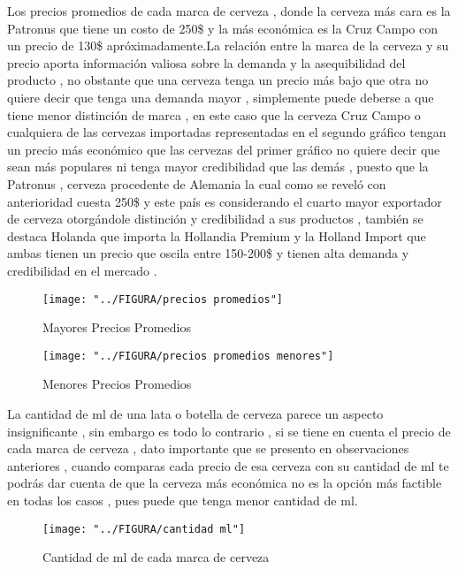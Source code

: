 \documentclass[10pt]{beamer}
\begin{document}
   	
   	\begin{frame}
   		
   	    Los precios promedios de cada marca de cerveza , donde la cerveza más cara es la Patronus que tiene un costo de 250\$ y la más económica es la Cruz Campo con un precio de 130\$ apróximadamente.La relación entre la marca de la cerveza y su precio aporta información valiosa sobre la demanda y la asequibilidad del producto , no obstante que una cerveza tenga un precio más bajo que otra no quiere decir que tenga una demanda mayor , simplemente puede deberse a que tiene menor distinción de marca , en este caso que la cerveza Cruz Campo o cualquiera de las cervezas importadas representadas en el segundo gráfico tengan un precio más económico que las cervezas del primer gráfico no quiere decir que sean más populares ni tenga mayor credibilidad que las demás , puesto que la Patronus , cerveza procedente de Alemania la cual como se reveló con anterioridad cuesta 250\$ y este país es considerando el cuarto mayor exportador de cerveza otorgándole distinción y credibilidad a sus productos , también se destaca Holanda que importa la Hollandia Premium y la Holland Import que ambas tienen un precio que oscila entre 150-200\$ y tienen alta demanda y credibilidad en el mercado . 
   	    
   	\end{frame}
   	
   	
   	\begin{frame}
   	
   	\begin{figure}
   		\centering
   		\texttt{[image: "../FIGURA/precios promedios"]}
   		\caption{Mayores Precios Promedios}
   		\label{fig:precios-promedios}
   	\end{figure}
   	
   	\begin{figure}
   		\centering
   		\texttt{[image: "../FIGURA/precios promedios menores"]}
   		\caption{Menores Precios Promedios}
   		\label{fig:precios-promedios-menores}
   	\end{figure}
   	
   	\end{frame}
   	
   	\begin{frame}
   		La cantidad de ml de una lata o botella de cerveza parece un aspecto insignificante , sin embargo es todo lo contrario , si se tiene en cuenta el precio de cada marca de cerveza , dato importante que se presento en observaciones anteriores , cuando comparas cada precio de esa cerveza con su cantidad de ml te podrás dar cuenta de que la cerveza más económica no es la opción más factible en todas los casos , pues puede que tenga menor cantidad de ml.
   		
   		\begin{figure}
   			\centering
   			\texttt{[image: "../FIGURA/cantidad ml"]}
   			\caption{Cantidad de ml de cada marca de cerveza}
   			\label{fig:cantidad-ml}
   		\end{figure}
   		
   	\end{frame}
   	
\end{document}
